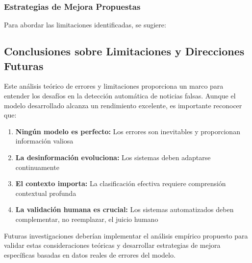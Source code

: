 \subsubsection{Estrategias de Mejora Propuestas}

Para abordar las limitaciones identificadas, se sugiere:

\begin{table}[htbp]
\centering
{}
\caption{Estrategias propuestas para abordar limitaciones identificadas.}
\label{tab:estrategias_mejora}
\end{table}

\subsection{Conclusiones sobre Limitaciones y Direcciones Futuras}

Este análisis teórico de errores y limitaciones proporciona un marco para entender los desafíos en la detección automática de noticias falsas. Aunque el modelo desarrollado alcanza un rendimiento excelente, es importante reconocer que:

\begin{enumerate}
    \item \textbf{Ningún modelo es perfecto:} Los errores son inevitables y proporcionan información valiosa
    \item \textbf{La desinformación evoluciona:} Los sistemas deben adaptarse continuamente
    \item \textbf{El contexto importa:} La clasificación efectiva requiere comprensión contextual profunda
    \item \textbf{La validación humana es crucial:} Los sistemas automatizados deben complementar, no reemplazar, el juicio humano
\end{enumerate}

Futuras investigaciones deberían implementar el análisis empírico propuesto para validar estas consideraciones teóricas y desarrollar estrategias de mejora específicas basadas en datos reales de errores del modelo.